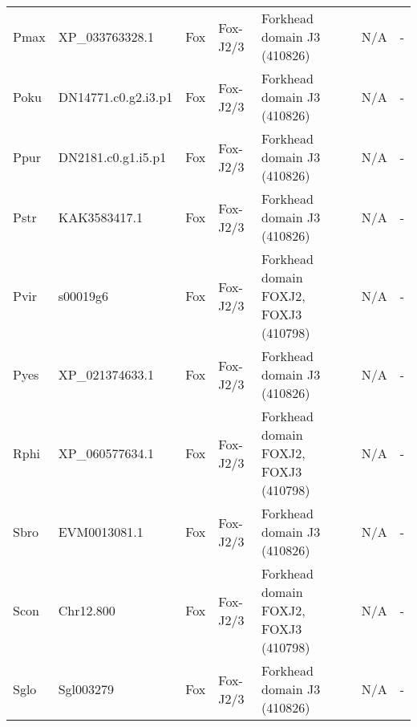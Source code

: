 \documentclass[../main.tex]{subfiles}
\begin{document}
\begin{landscape}
\begin{longtable}{lllllll}
		Pmax           & XP\_033763328.1       & Fox            & Fox-J2/3            & Forkhead domain J3 (410826)                 & N/A                                                                    & -                    \\
		Poku           & DN14771.c0.g2.i3.p1   & Fox            & Fox-J2/3            & Forkhead domain J3 (410826)                 & N/A                                                                    & -                    \\
		Ppur           & DN2181.c0.g1.i5.p1    & Fox            & Fox-J2/3            & Forkhead domain J3 (410826)                 & N/A                                                                    & -                    \\
		Pstr           & KAK3583417.1          & Fox            & Fox-J2/3            & Forkhead domain J3 (410826)                 & N/A                                                                    & -                    \\
		Pvir           & s00019g6              & Fox            & Fox-J2/3            & Forkhead domain FOXJ2, FOXJ3 (410798)       & N/A                                                                    & -                    \\
		Pyes           & XP\_021374633.1       & Fox            & Fox-J2/3            & Forkhead domain J3 (410826)                 & N/A                                                                    & -                    \\
		Rphi           & XP\_060577634.1       & Fox            & Fox-J2/3            & Forkhead domain FOXJ2, FOXJ3 (410798)       & N/A                                                                    & -                    \\
		Sbro           & EVM0013081.1          & Fox            & Fox-J2/3            & Forkhead domain J3 (410826)                 & N/A                                                                    & -                    \\
		Scon           & Chr12.800             & Fox            & Fox-J2/3            & Forkhead domain FOXJ2, FOXJ3 (410798)       & N/A                                                                    & -                    \\
		Sglo           & Sgl003279             & Fox            & Fox-J2/3            & Forkhead domain J3 (410826)                 & N/A                                                                    & -                    \\

\end{longtable}
\end{landscape}
\end{document}
